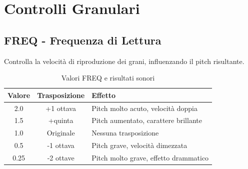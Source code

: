 \documentclass[a4paper,11pt,openany]{book}
\begin{document}
\section{Controlli Granulari}

\subsection{FREQ - Frequenza di Lettura}

Controlla la velocità di riproduzione dei grani, influenzando il pitch risultante.

\begin{table}[H]
    \centering
    \caption{Valori FREQ e risultati sonori}
    \label{tab:freq_values}
    \begin{tabular}{@{}ccp{6cm}@{}}
        \toprule
        \textbf{Valore} & \textbf{Trasposizione} & \textbf{Effetto} \\
        \midrule
        2.0 & +1 ottava & Pitch molto acuto, velocità doppia \\
        1.5 & +quinta & Pitch aumentato, carattere brillante \\
        1.0 & Originale & Nessuna trasposizione \\
        0.5 & -1 ottava & Pitch grave, velocità dimezzata \\
        0.25 & -2 ottave & Pitch molto grave, effetto drammatico \\
        \bottomrule
    \end{tabular}
\end{table}
\end{document}
